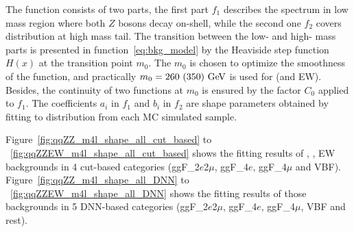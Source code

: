 The function consists of two parts, the first part $f_{1}$ describes the \mfl spectrum in low mass region where both $Z$ bosons decay on-shell, while the second one $f_{2}$ covers distribution at high mass tail.
The transition between the low- and high- mass parts is presented in function~\ref{eq:bkg_model} by the Heaviside step function $H(x)$ at the transition point $m_0$.
The $m_0$ is chosen to optimize the smoothness of the function, and practically $m_0 = 260~(350)~\text{Ge\kern -0.1em V}$ is used for \qqZZ (\ggZZ and \qqZZ EW).
Besides, the continuity of two functions at $m_0$ is ensured by the factor $C_0$ applied to $f_{1}$.
The coefficients $a_{i}$ in $f_{1}$ and $b_{i}$ in $f_{2}$ are shape parameters obtained by fitting to \mfl distribution from each MC simulated sample.

Figure~\ref{fig:qqZZ_m4l_shape_all_cut_based} to ~\ref{fig:qqZZEW_m4l_shape_all_cut_based} shows the fitting results of \qqZZ, \ggZZ, \qqZZ EW backgrounds in 4 cut-based categories (ggF\_2$e$2$\mu$, ggF\_4$e$, ggF\_4$\mu$ and VBF).
Figure~\ref{fig:qqZZ_m4l_shape_all_DNN} to ~\ref{fig:qqZZEW_m4l_shape_all_DNN} shows the fitting results of those backgrounds in 5 DNN-based categories (ggF\_2$e$2$\mu$, ggF\_4$e$, ggF\_4$\mu$, VBF and rest).

